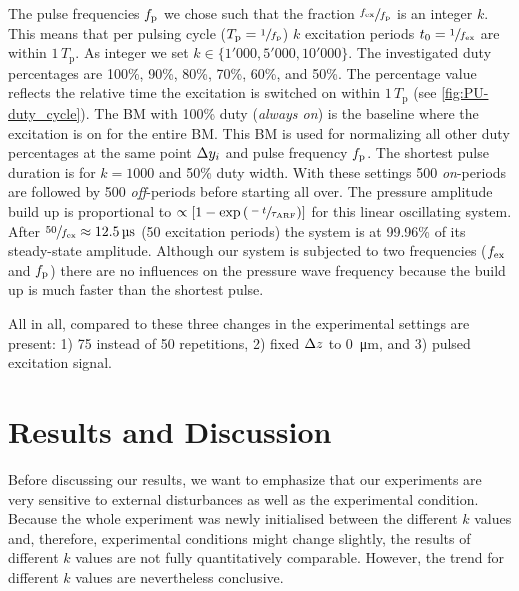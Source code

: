 The pulse frequencies $f_{\mathrm{p}}$ we chose such that the fraction $\sfrac{f_{\mathrm{ex}}}{f_{\mathrm{p}}}$ 
is an integer $k$. This means that per pulsing cycle 
($T_{\mathrm{p}}=\sfrac{1}{f_{\mathrm{p}}}$) $k$ excitation periods 
$t_{0}=\sfrac{1}{f_{\mathrm{ex}}}$ are within $1\,T_{\mathrm{p}}$. As integer we set 
$k\in\{1'000, 5'000, 10'000\}$. The investigated duty percentages are 100\%, 
90\%, 80\%, 70\%, 60\%, and 50\%. The percentage value reflects the relative 
time the excitation is switched on within $1\,T_{\mathrm{p}}$ (see 
\cref{fig:PU-duty_cycle}). The BM with 100\% duty (\emph{always on}) is the 
baseline where the excitation is on for the entire BM. This BM is used for 
normalizing all other duty percentages at the same point $\Delta y_{i}$ and pulse 
frequency $f_{\mathrm{p}}$. The shortest pulse duration is for $k=1000$ and 50\% duty 
width. With these settings 500 \emph{on}-periods are followed by 500 
\emph{off}-periods before starting all over. The pressure amplitude build up is 
proportional to $\propto\left[ 1-\exp\left( \sfrac{-t}{\tau_{\mathrm{ARF}}} 
\right) \right]$ for this linear oscillating system. After 
$\sfrac{50}{\fex}\approx\SI{12.5}{\us}$ (50 excitation periods) the system is 
at 99.96\% of its steady-state amplitude. Although our system is subjected to 
two frequencies ($f_{\mathrm{ex}}$ and $f_{\mathrm{p}}$) there are no influences on the pressure wave 
frequency because the build up is much faster than the shortest pulse.

All in all, compared to \cite{Goering2021} these three changes in the 
experimental settings are present: 1) 75 instead of 50 repetitions, 2) fixed 
$\Delta z$ to \SI{0}{\um}, and 3) pulsed excitation signal.

\section{Results and Discussion}

Before discussing our results, we want to emphasize that our experiments are 
very sensitive to external disturbances as well as the experimental condition. 
Because the whole experiment was newly initialised between the different $k$ 
values and, therefore, experimental conditions might change slightly, the 
results of different $k$ values are not fully quantitatively comparable. 
However, the trend for different $k$ values are nevertheless conclusive.

